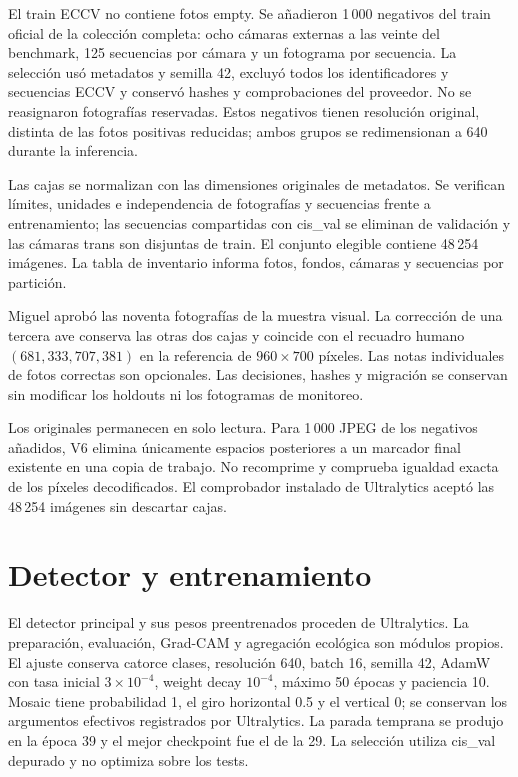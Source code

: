 El train ECCV no contiene fotos empty. Se añadieron 1\,000 negativos del train oficial
 de la colección completa: ocho cámaras externas a las veinte del benchmark, 125
secuencias por cámara y un fotograma por secuencia. La selección usó metadatos y semilla
42, excluyó todos los identificadores y secuencias ECCV y conservó hashes y comprobaciones
 del proveedor. No se reasignaron fotografías reservadas. Estos negativos tienen
resolución original, distinta de las fotos positivas reducidas; ambos grupos se
redimensionan a 640 durante la inferencia.

Las cajas se normalizan con las dimensiones originales de metadatos. Se verifican
límites, unidades e independencia de fotografías y secuencias frente a entrenamiento;
las secuencias compartidas con cis\_val se eliminan de validación y las cámaras trans
son disjuntas de train. El conjunto elegible contiene 48\,254 imágenes. La tabla de
inventario informa fotos, fondos, cámaras y secuencias por partición.

Miguel aprobó las noventa fotografías de la muestra visual. La corrección de una
tercera ave conserva las otras dos cajas y coincide con el recuadro humano
$(681,333,707,381)$ en la referencia de $960\times700$ píxeles. Las notas individuales
 de fotos correctas son opcionales. Las decisiones, hashes y migración se conservan
sin modificar los holdouts ni los fotogramas de monitoreo.

Los originales permanecen en solo lectura. Para 1\,000 JPEG de los negativos añadidos,
V6 elimina únicamente espacios posteriores a un marcador final existente en una copia
 de trabajo. No recomprime y comprueba igualdad exacta de los píxeles decodificados.
El comprobador instalado de Ultralytics aceptó las 48\,254 imágenes sin descartar cajas.

\section{Detector y entrenamiento}
El detector principal y sus pesos preentrenados proceden de Ultralytics. La preparación,
evaluación, Grad-CAM y agregación ecológica son módulos propios. El ajuste conserva
catorce clases, resolución 640, batch 16, semilla 42, AdamW con tasa inicial
$3\times10^{-4}$, weight decay $10^{-4}$, máximo 50 épocas y paciencia 10.
Mosaic tiene probabilidad 1, el giro horizontal 0.5 y el vertical 0; se conservan
los argumentos efectivos registrados por Ultralytics.
La parada temprana se produjo en la época 39 y el mejor checkpoint fue el de la 29.
La selección utiliza cis\_val depurado y no optimiza sobre los tests.

